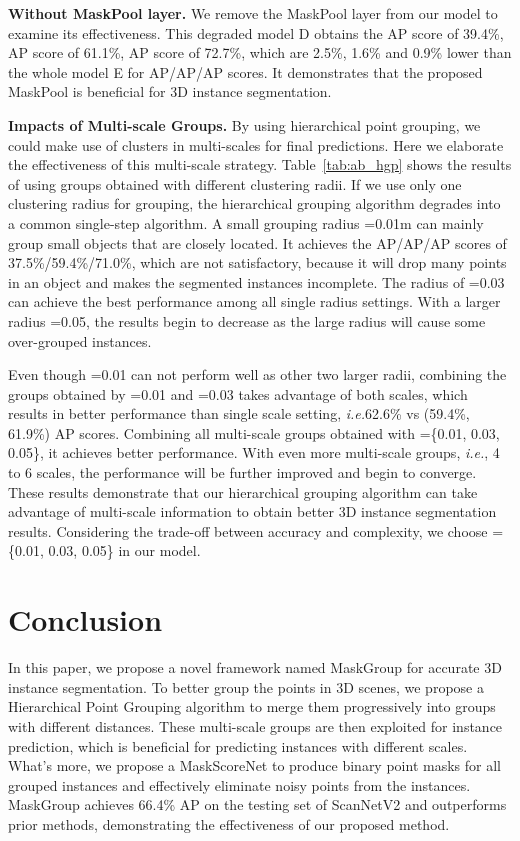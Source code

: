 \documentclass{article}
\newcommand{\ie}{\emph{i.e.}}
\begin{document}
\noindent\textbf{Without MaskPool layer.}
We remove the MaskPool layer from our model to examine its effectiveness.
This degraded model D obtains the  AP score of 39.4\%,  AP score of 61.1\%,  AP score of 72.7\%, which are 2.5\%, 1.6\% and 0.9\% lower than the whole model E for AP/AP/AP scores.  It demonstrates that the proposed MaskPool is beneficial for 3D instance segmentation.

\noindent\textbf{Impacts of Multi-scale Groups.}
By using hierarchical point grouping, we could make use of clusters in multi-scales for final predictions. Here we elaborate the effectiveness of this multi-scale strategy. 
Table~\ref{tab:ab_hgp} shows the results of using groups obtained with different clustering radii.
If we use only one clustering radius for grouping, the hierarchical grouping algorithm degrades into a common single-step algorithm.
A small grouping radius {=0.01m} can mainly group small objects that are closely located.
It achieves the AP/AP/AP scores of 37.5\%/59.4\%/71.0\%, which are not satisfactory, because it will drop many points in an object and makes the segmented instances incomplete.
The radius of {=0.03} can achieve the best performance among all single radius settings.
With a larger radius {=0.05}, the results begin to decrease as the large radius will cause some over-grouped instances.

Even though {=0.01} can not perform well as other two larger radii, combining the groups obtained by  {=0.01}  and  {=0.03} takes advantage of both scales,
which results in better performance than single scale setting, \ie 62.6\% vs (59.4\%, 61.9\%) AP scores.
Combining all multi-scale groups obtained with =\{0.01, 0.03, 0.05\}, it achieves better performance.
With even more multi-scale groups, \ie, 4 to 6 scales, the performance will be further improved and begin to converge.
These results demonstrate that our hierarchical grouping algorithm can take advantage of multi-scale information to obtain better 3D instance segmentation results. Considering the trade-off between accuracy and complexity, we choose =\{0.01, 0.03, 0.05\} in our model.

\section{Conclusion}
In this paper, we propose a novel framework named MaskGroup for accurate 3D instance segmentation.
To better group the points in 3D scenes, we propose a Hierarchical Point Grouping algorithm to merge them progressively into groups with different distances.
These multi-scale groups are then exploited for instance prediction, which is beneficial for predicting instances with different scales.
What's more, we propose a  MaskScoreNet to produce binary point masks for all grouped instances and effectively eliminate noisy points from the instances.
MaskGroup achieves 66.4\% AP on the testing set of ScanNetV2 and outperforms prior methods, demonstrating the effectiveness of our proposed method.
\end{document}
